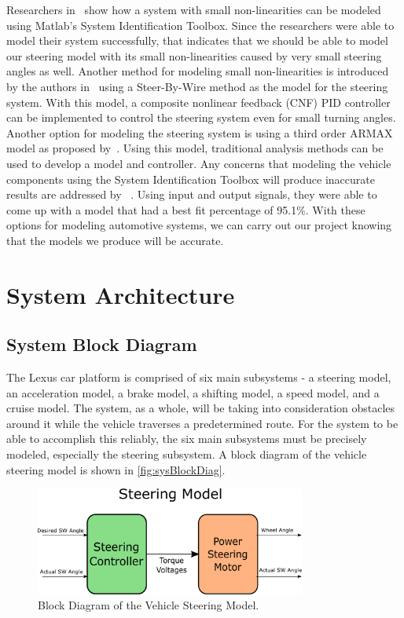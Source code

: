 \documentclass[12pt]{article} %
\begin{document}
Researchers in~\cite{Adnan2010} show how a system with small non-linearities can
be modeled using Matlab's System Identification Toolbox. Since the researchers
were able to model their system successfully, that indicates that we should be
able to model our steering model with its small non-linearities caused by very
small steering angles as well. Another method for modeling small non-linearities
is introduced by the authors in~\cite{Saruchi2015} using a Steer-By-Wire method
as the model for the steering system. With this model, a composite nonlinear
feedback (CNF) PID controller can be implemented to control the steering system
even for small turning angles. Another option for modeling the steering system
is using a third order ARMAX model as proposed by~\cite{Li1999}. Using this
model, traditional analysis methods can be used to develop a model and
controller. Any concerns that modeling the vehicle components using the System
Identification Toolbox will produce inaccurate results are addressed by
~\cite{Donjaroennon2021}. Using input and output signals, they were able to come
up with a model that had a best fit percentage of 95.1\%. With these options for
modeling automotive systems, we can carry out our project knowing that the
models we produce will be accurate.

\section{System Architecture}
\subsection{System Block Diagram}
The Lexus car platform is comprised of six main subsystems - a steering model,
an acceleration model, a brake model, a shifting model, a speed model, and a
cruise model. The system, as a whole, will be taking into consideration
obstacles around it while the vehicle traverses a predetermined route. For the
system to be able to accomplish this reliably, the six main subsystems must be
precisely modeled, especially the steering subsystem. A block diagram of the
vehicle steering model is shown in \autoref{fig:sysBlockDiag}. %
%
\begin{figure}[h]
    \centering
    \captionsetup{justification=centering, margin=3cm}
    \includegraphics[width=3.5in]{figs/inkscape/steeringModelArchitecture}
    \caption{Block Diagram of the Vehicle Steering Model.}
    \label{fig:sysBlockDiag}
\end{figure}
%
\end{document}
